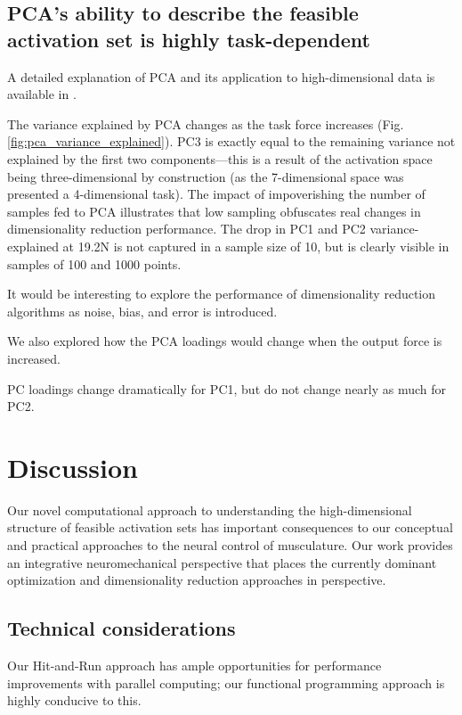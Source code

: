 \documentclass[10pt,letterpaper]{article}
\begin{document}
\subsection*{PCA's ability to describe the feasible activation set is highly task-dependent}
A detailed explanation of PCA and its application to high-dimensional data is available in \cite{valero-cuevas2015fundamentals}. 




The variance explained by PCA changes as the task force increases (Fig. \ref{fig:pca_variance_explained}). PC3 is exactly equal to the remaining variance not explained by the first two components---this is a result of the activation space being three-dimensional by construction (as the 7-dimensional space was presented a 4-dimensional task). The impact of impoverishing the number of samples fed to PCA illustrates that low sampling obfuscates real changes in dimensionality reduction performance. The drop in PC1 and PC2 variance-explained at 19.2N is not captured in a sample size of 10, but is clearly visible in samples of 100 and 1000 points.

It would be interesting to explore the performance of dimensionality reduction algorithms as noise, bias, and error is introduced.

We also explored how the PCA loadings would change when the output force is increased. 

PC loadings change dramatically for PC1, but do not change nearly as much for PC2.




\section*{Discussion}
Our novel computational approach to understanding the high-dimensional structure of feasible activation sets has important consequences to our conceptual and practical approaches to the neural control of musculature.  Our work provides an integrative neuromechanical perspective that places the currently dominant optimization and dimensionality reduction approaches in perspective. 

\subsection*{Technical considerations}
Our Hit-and-Run approach has ample opportunities for performance improvements with parallel computing; our functional programming approach is highly conducive to this.
\end{document}
